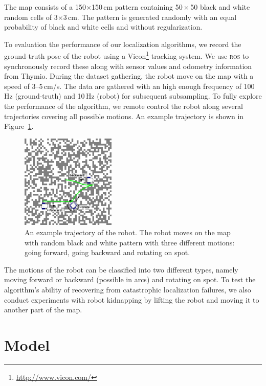 \documentclass[letterpaper, 10pt, conference]{ieeeconf}
\newcommand{\fig}[1]{Figure~\ref{fig:#1}}
\begin{document}
The map consists of a 150$\times$150\,cm pattern containing 50\,$\times$\,50 black and white random cells of 3$\times$3\,cm.
The pattern is generated randomly with an equal probability of black and white cells and without regularization.

To evaluation the performance of our localization algorithms, we record the ground-truth pose of the robot using a Vicon\footnote{\url{http://www.vicon.com/}} tracking system.
We use \textsc{ros} to synchronously record these along with sensor values and odometry information from Thymio.
During the dataset gathering, the robot move on the map with a speed of 3--5\,cm/s.
The data are gathered with an high enough frequency of 100\,Hz (ground-truth) and 10\,Hz (robot) for subsequent subsampling.
To fully explore the performance of the algorithm, we remote control the robot along several trajectories covering all possible motions.
An example trajectory is shown in \fig{dataset}.

\begin{figure}
\begin{center}
\includegraphics[width=0.4\textwidth]{dataset}
\caption{An example trajectory of the robot. The robot moves on the map with random black and white pattern with three different motions: going forward, going backward and rotating on spot.}
\label{fig:dataset}
\end{center}
\end{figure}

The motions of the robot can be classified into two different types, namely moving forward or backward (possible in arcs) and rotating on spot.
To test the algorithm's ability of recovering from catastrophic localization failures, we also conduct experiments with robot kidnapping by lifting the robot and moving it to another part of the map.

\section{Model}
\end{document}
